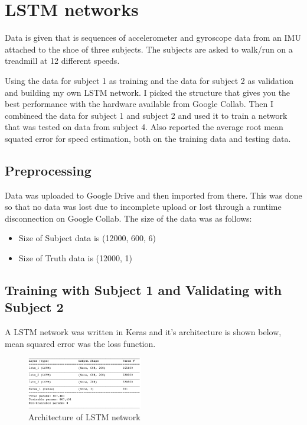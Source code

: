 \documentclass[conference]{IEEEtran}
\begin{document}
    \section{LSTM networks}

    Data is given that is sequences of accelerometer and gyroscope data from an IMU attached
    to the shoe of three subjects. The subjects are asked to walk/run on a treadmill at 12 different speeds.

    Using the data for subject 1 as training and the data for subject 2 as validation and building my own LSTM network.
    I picked the structure that gives you the best performance with the hardware available from Google Collab. Then I combineed 
    the data for subject 1 and subject 2 and used it to train a network that was tested on data from subject 4. Also reported the average
    root mean squated error for speed estimation, both on the training data and testing data.

    \subsection{Preprocessing}

    Data was uploaded to Google Drive and then imported from there. This was done so that no data was lost due to incomplete upload
    or lost through a runtime disconnection on Google Collab. The size of the data was as follows:

    \begin{itemize}
        \item Size of Subject data is (12000, 600, 6)
        \item Size of Truth data is (12000, 1)
    \end{itemize} 

    \subsection{Training with Subject 1 and Validating with Subject 2}

    A LSTM network was written in Keras and it's architecture is shown below, mean squared error was the loss function.

    \begin{figure}[H]
        \centering
        \captionsetup{justification=centering}
        \centering
            \includegraphics[width=0.45\textwidth]{43.png}
            \caption{Architecture of LSTM network}
    \end{figure}
\end{document}
